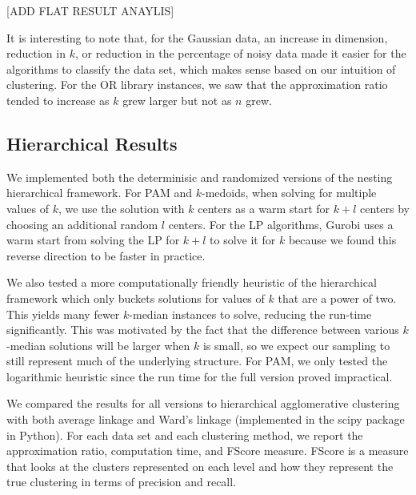 \documentclass[conference, 10pt, final]{IEEEtran}
\begin{document}
[ADD FLAT RESULT ANAYLIS]

It is interesting to note that, for the Gaussian data, an increase in dimension, reduction in $k$, or reduction in the percentage of noisy data made it easier for the algorithms to classify the data set, which makes sense based on our intuition of clustering. For the OR library instances, we saw that the approximation ratio tended to increase as $k$ grew larger but not as $n$ grew. 

\subsection{Hierarchical Results}
We implemented both the determinisic and randomized versions of the nesting hierarchical framework. For PAM and $k$-medoids, when solving for multiple values of $k$, we use the solution with $k$ centers as a warm start for $k+l$ centers by choosing an additional random $l$ centers. For the LP algorithms, Gurobi uses a warm start from solving the LP for $k+l$ to solve it for $k$ because we found this reverse direction to be faster in practice. 

We also tested a more computationally friendly heuristic of the hierarchical framework which only buckets solutions for values of $k$ that are a power of two. This yields many fewer $k$-median instances to solve, reducing the run-time significantly. This was motivated by the fact that the difference between various $k$-median solutions will be larger when $k$ is small, so we expect our sampling to still represent much of the underlying structure. For PAM, we only tested the logarithmic heuristic since the run time for the full version proved impractical. 

We compared the results for all versions to hierarchical agglomerative clustering with both average linkage and Ward's linkage (implemented in the scipy package in Python). 
For each data set and each clustering method, we report the approximation ratio, computation time, and FScore measure.  FScore is a measure that looks at the clusters represented on each level and how they represent the true clustering in terms of precision and recall. 
\end{document}
